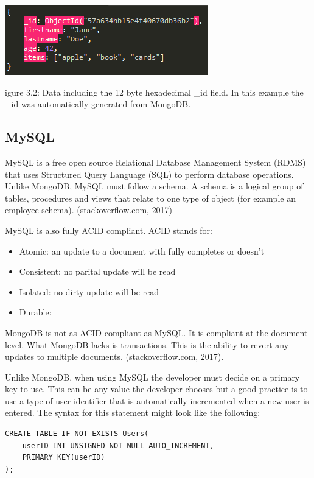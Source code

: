 \documentclass[12pt]{article}
\begin{document}
\begin{center}
	\includegraphics[scale=1]{json_id.PNG}
	
	\caption Figure 3.2: Data including the 12 byte hexadecimal {\_}id field. In this example the {\_}id was automatically generated from MongoDB. 
\end{center}

\begin{center}
\subsection{MySQL}
\end{center}
MySQL is a free open source Relational Database Management System (RDMS) that uses Structured Query Language (SQL) to perform database operations. Unlike MongoDB, MySQL must follow a schema. A schema is a logical group of tables, procedures and views that relate to one type of object (for example an employee schema). (stackoverflow.com, 2017)

MySQL is also fully ACID compliant. ACID stands for: 
\begin{itemize}
	\item Atomic: an update to a document with fully completes or doesn't
	\item Consistent: no parital update will be read
	\item Isolated: no dirty update will be read
	\item Durable: 
\end{itemize}

MongoDB is not as ACID compliant as MySQL. It is compliant at the document level. What MongoDB lacks is transactions. This is the ability to revert any updates to multiple documents. (stackoverflow.com, 2017).

Unlike MongoDB, when using MySQL the developer must decide on a primary key to use. This can be any value the developer chooses but a good practice is to use a type of user identifier that is automatically incremented when a new user is entered. The syntax for this statement might look like the following: 

\begin{verbatim}
CREATE TABLE IF NOT EXISTS Users(
	userID INT UNSIGNED NOT NULL AUTO_INCREMENT,
	PRIMARY KEY(userID)
);
\end{verbatim}
\end{document}
